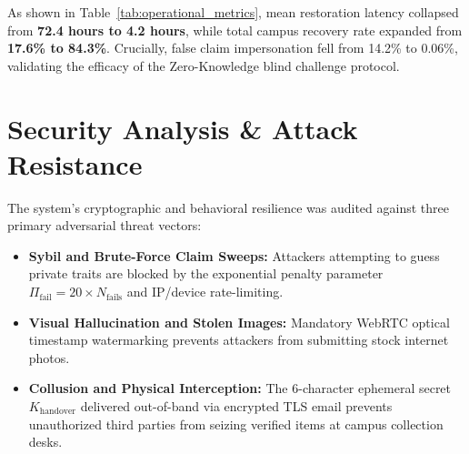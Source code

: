\documentclass[conference]{IEEEtran}
\begin{document}
\begin{table}[htbp]
\caption{Operational Efficiency and Restoration Telemetry}
\label{tab:operational_metrics}
\centering
{}
\end{table}

\balance

As shown in Table~\ref{tab:operational_metrics}, mean restoration latency collapsed from \textbf{72.4 hours to 4.2 hours}, while total campus recovery rate expanded from \textbf{17.6\% to 84.3\%}. Crucially, false claim impersonation fell from 14.2\% to 0.06\%, validating the efficacy of the Zero-Knowledge blind challenge protocol.

\section{Security Analysis \& Attack Resistance}
The system's cryptographic and behavioral resilience was audited against three primary adversarial threat vectors:
\begin{itemize}
    \item \textbf{Sybil and Brute-Force Claim Sweeps:} Attackers attempting to guess private traits are blocked by the exponential penalty parameter $\Pi_{\text{fail}} = 20 \times N_{\text{fails}}$ and IP/device rate-limiting.
    \item \textbf{Visual Hallucination and Stolen Images:} Mandatory WebRTC optical timestamp watermarking prevents attackers from submitting stock internet photos.
    \item \textbf{Collusion and Physical Interception:} The 6-character ephemeral secret $K_{\text{handover}}$ delivered out-of-band via encrypted TLS email prevents unauthorized third parties from seizing verified items at campus collection desks.
\end{itemize}
\end{document}
